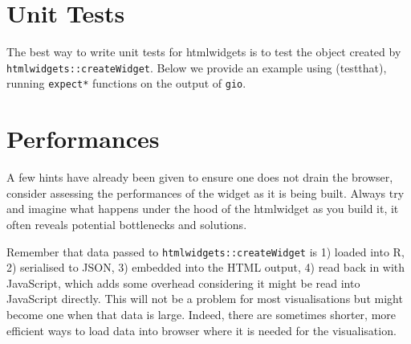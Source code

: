 \documentclass[
]{krantz}
\makeatletter
\newenvironment{Shaded}{\begin{snugshade}}{\end{snugshade}}
\newcommand{\CommentTok}[1]{\textcolor[rgb]{0.37,0.37,0.37}{\textit{#1}}}
\newcommand{\KeywordTok}[1]{\textcolor[rgb]{0.27,0.27,0.27}{\textbf{#1}}}
\newcommand{\NormalTok}[1]{#1}
\newcommand{\OperatorTok}[1]{\textcolor[rgb]{0.43,0.43,0.43}{\textbf{#1}}}
\newcommand{\StringTok}[1]{\textcolor[rgb]{0.5,0.5,0.5}{#1}}
\newenvironment{kframe}{%
\medskip{}
\setlength{\fboxsep}{.8em}
 \def\at@end@of@kframe{}%
 \ifinner\ifhmode%
  \def\at@end@of@kframe{\end{minipage}}%
  \begin{minipage}{\columnwidth}%
 \fi\fi%
 \def\FrameCommand##1{\hskip\@totalleftmargin \hskip-\fboxsep
 \colorbox{shadecolor}{##1}\hskip-\fboxsep
     \hskip-\linewidth \hskip-\@totalleftmargin \hskip\columnwidth}%
 \MakeFramed {\advance\hsize-\width
   \@totalleftmargin\z@ \linewidth\hsize
   \@setminipage}}%
 {\par\unskip\endMakeFramed%
 \at@end@of@kframe}
\renewenvironment{Shaded}{\begin{kframe}}{\end{kframe}}
\makeatother
\begin{document}
\hypertarget{unit-tests}{%
\section{Unit Tests}\label{unit-tests}}

The best way to write unit tests for htmlwidgets is to test the object created by \texttt{htmlwidgets::createWidget}. Below we provide an example using (testthat)\citep{R-testthat}, running \texttt{expect*} functions on the output of \texttt{gio}.

\begin{Shaded}
\end{Shaded}

\hypertarget{performances}{%
\section{Performances}\label{performances}}

A few hints have already been given to ensure one does not drain the browser, consider assessing the performances of the widget as it is being built. Always try and imagine what happens under the hood of the htmlwidget as you build it, it often reveals potential bottlenecks and solutions.

Remember that data passed to \texttt{htmlwidgets::createWidget} is 1) loaded into R, 2) serialised to JSON, 3) embedded into the HTML output, 4) read back in with JavaScript, which adds some overhead considering it might be read into JavaScript directly. This will not be a problem for most visualisations but might become one when that data is large. Indeed, there are sometimes shorter, more efficient ways to load data into browser where it is needed for the visualisation.
\end{document}
